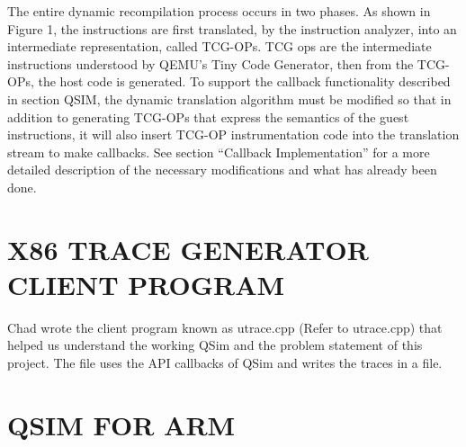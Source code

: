 \documentclass[letterpaper,10pt,twocolumn]{article}
\begin{document}
The entire dynamic recompilation process occurs in two phases. As shown in Figure 1, the instructions are first translated, by the instruction analyzer, into an intermediate representation, called TCG-OPs. TCG ops are the intermediate instructions understood by QEMU's Tiny Code Generator, then from the TCG-OPs, the host code is generated.
To support the callback functionality described in section QSIM, the dynamic translation algorithm must be modified so that in addition to generating TCG-OPs that express the semantics of the guest instructions, it will also insert TCG-OP instrumentation code into the translation stream to make callbacks. See section “Callback Implementation” for a more detailed description of the necessary modifications and what has already been done.
\section{X86 TRACE GENERATOR CLIENT PROGRAM}
Chad wrote the client program known as utrace.cpp (Refer to utrace.cpp) that helped us understand the working QSim and the problem statement of this project. The file uses the API callbacks of QSim and writes the traces in a file.
\section{QSIM FOR ARM}
\end{document}
